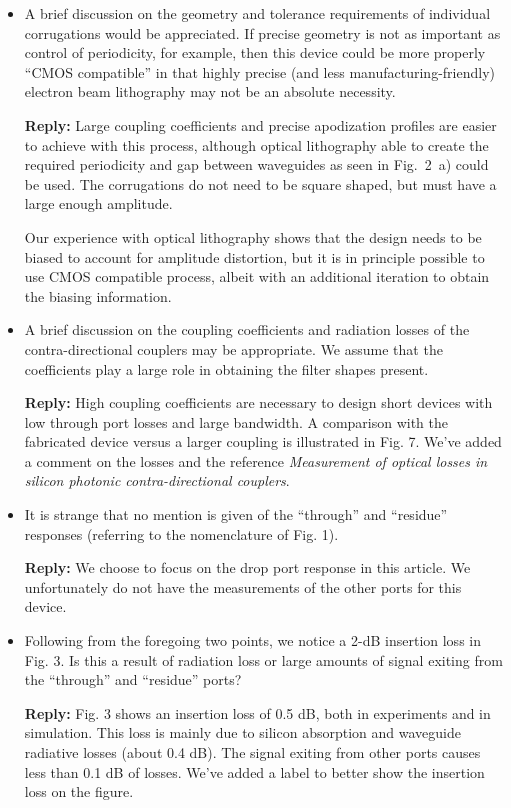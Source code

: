 \documentclass[]{letter}
\begin{document}
\begin{itemize}
\item A brief discussion on the geometry and tolerance requirements of individual corrugations would be appreciated. If precise geometry is not as important as control of periodicity, for example, then this device could be more properly “CMOS compatible” in that highly precise (and less manufacturing-friendly) electron beam lithography may not be an absolute necessity.

\textbf{Reply:} Large coupling coefficients and precise apodization profiles are easier to achieve with this process, although optical lithography able to create the required periodicity and gap between waveguides as seen in Fig.~2~a) could be used. The corrugations do not need to be square shaped, but must have a large enough amplitude.
	
Our experience with optical lithography shows that the design needs to be biased to account for amplitude distortion, but it is in principle possible to use CMOS compatible process, albeit with an additional iteration to obtain the biasing information.

\item A brief discussion on the coupling coefficients and radiation losses of the contra-directional couplers may be appropriate. We assume that the coefficients play a large role in obtaining the filter shapes present.

\textbf{Reply:} High coupling coefficients are necessary to design short devices with low through port losses and large bandwidth. A comparison with the fabricated device versus a larger coupling is illustrated in Fig. 7. We've added a comment on the losses and the reference \textit{Measurement of optical losses in silicon photonic contra-directional couplers}.

\item It is strange that no mention is given of the “through” and “residue” responses (referring to the nomenclature of Fig. 1).

\textbf{Reply:} We choose to focus on the drop port response in this article. We unfortunately do not have the measurements of the other ports for this device.

\item Following from the foregoing two points, we notice a 2-dB insertion loss in Fig. 3. Is this a result of radiation loss or large amounts of signal exiting from the “through” and “residue” ports?

\textbf{Reply:} Fig. 3 shows an insertion loss of 0.5 dB, both in experiments and in simulation. This loss is  mainly due to silicon absorption and waveguide radiative losses (about 0.4 dB). The signal exiting from other ports causes less than 0.1 dB of losses. We've added a label to better show the insertion loss on the figure.


\end{itemize}
\end{document}
